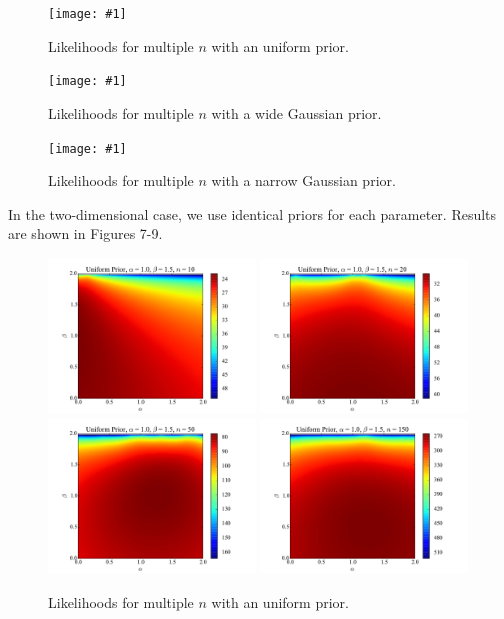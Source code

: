 \documentclass{article}
\theoremstyle{definition}
\newcommand{\plop}[2]{
    \begin{figure}\centering
        \texttt{[image: \#1]}
        \caption{\label{#1}#2}
    \end{figure}
}
\begin{document}
\plop{lh1d_uniform.pdf}{Likelihoods for multiple $n$ with an
uniform prior.}
\plop{lh1d_widegauss.pdf}{Likelihoods for multiple $n$ with a
wide Gaussian prior.}
\plop{lh1d_narrowgauss.pdf}{Likelihoods for multiple $n$ with a narrow
Gaussian prior.}

In the two-dimensional case, we use identical priors for each parameter.
Results are shown in Figures 7-9.

\begin{figure}\centering
    \includegraphics[width=0.49\textwidth]{lh2d_1.pdf}
    \includegraphics[width=0.49\textwidth]{lh2d_2.pdf}
    \\
    \includegraphics[width=0.49\textwidth]{lh2d_3.pdf}
    \includegraphics[width=0.49\textwidth]{lh2d_4.pdf}
    \caption{\label{2d_uniform}Likelihoods for multiple $n$ with an uniform
    prior.}
\end{figure}
\end{document}
